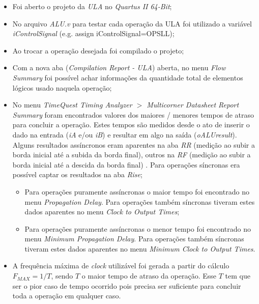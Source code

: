 \documentclass[12pt]{article}
\begin{document}
\begin{itemize}
	\item Foi aberto o projeto da \textit{ULA} no \textit{Quartus II 64-Bit};
	\item No arquivo \textit{ALU.v} para testar cada operação da ULA foi utilizado a variável \textit{iControlSignal} (e.g. assign iControlSignal=OPSLL);
	\item Ao trocar a operação desejada foi compilado o projeto;
	\item Com a nova aba (\textit{Compilation Report - ULA}) aberta, no menu \textit{Flow Summary} foi possível achar informações da quantidade total de elementos lógicos usado naquela operação;
	\item No menu \textit{TimeQuest Timing Analyzer $>$ Multicorner Datasheet Report Summary} foram encontrados valores dos maiores / menores tempos de atraso para concluir a operação. Estes tempos são medidos desde o ato de inserir o dado na entrada (\textit{iA} e/ou \textit{iB}) e resultar em algo na saída (\textit{oALUresult}). Alguns resultados assíncronos eram aparentes na aba \textit{RR} (medição ao subir a borda inicial até a subida da borda final), outros na \textit{RF} (medição ao subir a borda inicial até a descida da borda final) \cite{altera}. Para operações síncronas era possível captar os resultados na aba \textit{Rise};
		\begin{itemize}
			\item Para operações puramente assíncronas o maior tempo foi encontrado no menu \textit{Propagation Delay}. Para operações também síncronas tiveram estes dados aparentes no menu \textit{Clock to Output Times}; 
			\item Para operações puramente assíncronas o menor tempo foi encontrado no menu \textit{Minimum Propagation Delay}. Para operações também síncronas tiveram estes dados aparentes no menu \textit{Minimum Clock to Output Times}. 
		\end{itemize}
	\item A frequência máxima de \textit{clock} utilizável foi gerada a partir do cálculo $F_{MAX} = 1/T$, sendo $T$ o maior tempo de atraso da operação. Esse $T$ tem que ser o pior caso de tempo ocorrido pois precisa ser suficiente para concluir toda a operação em qualquer caso.
\end{itemize}
\end{document}
